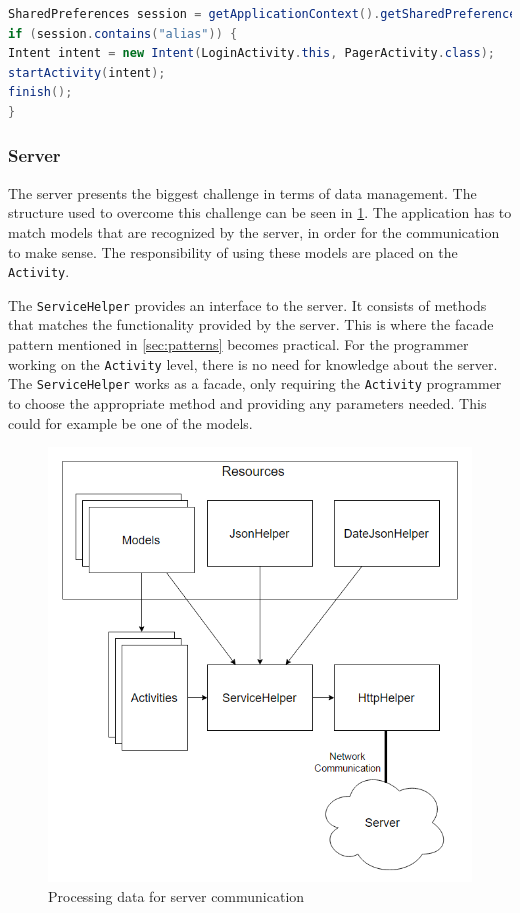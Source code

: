 \begin{lstlisting}[language=java, label={lst:login_check}, caption={Checking whether the user should login}]
SharedPreferences session = getApplicationContext().getSharedPreferences(getString(R.string.app_name), 0);
if (session.contains("alias")) {
Intent intent = new Intent(LoginActivity.this, PagerActivity.class);
startActivity(intent);
finish();
}
\end{lstlisting}  

\subsubsection{Server}
\label{subsubsec:server}
The server presents the biggest challenge in terms of data management. The structure used to overcome this challenge can be seen in \ref{fig:application_dataflow}. The application has to match models that are recognized by the server, in order for the communication to make sense. The responsibility of using these models are placed on the \texttt{Activity}.

The \texttt{ServiceHelper} provides an interface to the server. It consists of methods that matches the functionality provided by the server. This is where the facade pattern mentioned in \ref{sec:patterns} becomes practical. For the programmer working on the \texttt{Activity} level, there is no need for knowledge about the server. The \texttt{ServiceHelper} works as a facade, only requiring the \texttt{Activity} programmer to choose the appropriate method and providing any parameters needed. This could for example be one of the models.

\begin{figure}[H]
	\centering
	\includegraphics[width=\textwidth]{Pictures/application_dataflow.png}
	\caption{Processing data for server communication}
	\label{fig:application_dataflow}
\end{figure}

